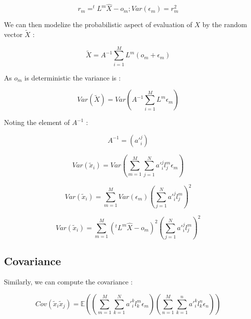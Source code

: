 \begin{equation}
      r_m  = ^tL^m \hat{X} - o_m  ; Var({\epsilon}_m) = r_m^2
      \label{Eq:Empir:Var}
\end{equation}

We can then modelize the probabilistic aspect of evaluation of $X$ by the random vector $\tilde X$ :

\begin{equation}
     \tilde X  =  A^{-1}  \sum\limits_{i=1}^M   {L^m}  (o_m + {\epsilon}_m) 
\end{equation}

As $o_m$ is deterministic the variance is :

\begin{equation}
     Var(\tilde X)  =  Var (A^{-1}  \sum\limits_{i=1}^M   {L^m}  {\epsilon}_m)
\end{equation}


Noting the element of $A^{-1}$ :

\begin{equation}
     A^{-1} = ( {a'}_i^j)
\end{equation}

\begin{equation}
     Var( \tilde x_i)  =   Var({\sum\limits_{m=1}^M}  {\sum\limits_{j=1}^N}  {a'}_i^j   {l^m_j}   {\epsilon}_m)
\end{equation}


\begin{equation}
     Var( \tilde x_i)  =   \sum\limits_{m=1}^M  Var({\epsilon}_m)  (\sum\limits_{j=1}^N   {a'}_i^j  {l^m_j}   ) ^2 
\end{equation}



\begin{equation}
     Var(\tilde x_i) = \sum\limits_{m=1}^M (^tL^m \hat{X} - o_m )^2 (\sum\limits_{j=1}^N {a'}_i^j {l^m_j})^2 
\end{equation}


\subsection{Covariance}
\label{Sec:CovLsq}

Similarly, we can compute the covariance :

\begin{equation}
     Cov(\tilde x_i \tilde x_j)  =   \mathbb{E} (
                            ({\sum\limits_{m=1}^M}  {\sum\limits_{k=1}^N}  {a'}_i^k   {l^m_k}   {\epsilon}_m)
                            ({\sum\limits_{n=1}^M}  {\sum\limits_{k=1}^n}  {a'}_i^k   {l^n_k}   {\epsilon}_n)
                       )
\end{equation}


